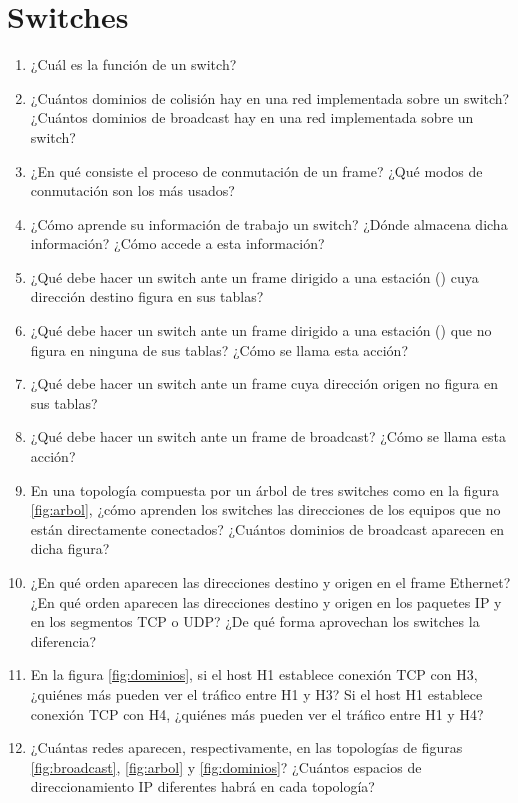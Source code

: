 

\section{Switches}
\label{sub:Switches}

\begin{enumerate}
\item ¿Cuál es la función de un switch? 
\item ¿Cuántos dominios de colisión hay en una red implementada sobre un switch? ¿Cuántos dominios de broadcast hay en una red implementada sobre un switch?
\item ¿En qué consiste el proceso de conmutación de un frame? ¿Qué modos de conmutación son los más usados?
\item ¿Cómo aprende su información de trabajo un switch? ¿Dónde almacena dicha información? ¿Cómo accede a esta información?
\item ¿Qué debe hacer un switch ante un frame dirigido a una estación () cuya dirección destino figura en sus tablas? 
\item ¿Qué debe hacer un switch ante un frame dirigido a una estación () que no figura en ninguna de sus tablas? ¿Cómo se llama esta acción?
\item ¿Qué debe hacer un switch ante un frame cuya dirección origen no figura en sus tablas? 
\item ¿Qué debe hacer un switch ante un frame de broadcast? ¿Cómo se llama esta acción?
\item En una topología compuesta por un árbol de tres switches como en la figura \ref{fig:arbol}, ¿cómo aprenden los switches las direcciones de los equipos que no están directamente conectados? ¿Cuántos dominios de broadcast aparecen en dicha figura?
\item ¿En qué orden aparecen las direcciones destino y origen en el frame Ethernet? ¿En qué orden aparecen las direcciones destino y origen en los paquetes IP y en los segmentos TCP o UDP? ¿De qué forma aprovechan los switches la diferencia?

\item En la figura \ref{fig:dominios}, si el host H1 establece conexión TCP con H3, ¿quiénes más pueden ver el tráfico entre H1 y H3? Si el host H1 establece conexión TCP con H4, ¿quiénes más pueden ver el tráfico entre H1 y H4?

\item ¿Cuántas redes aparecen, respectivamente, en las topologías de figuras \ref{fig:broadcast}, \ref{fig:arbol} y \ref{fig:dominios}? ¿Cuántos espacios de direccionamiento IP diferentes habrá en cada topología?


\end{enumerate}
